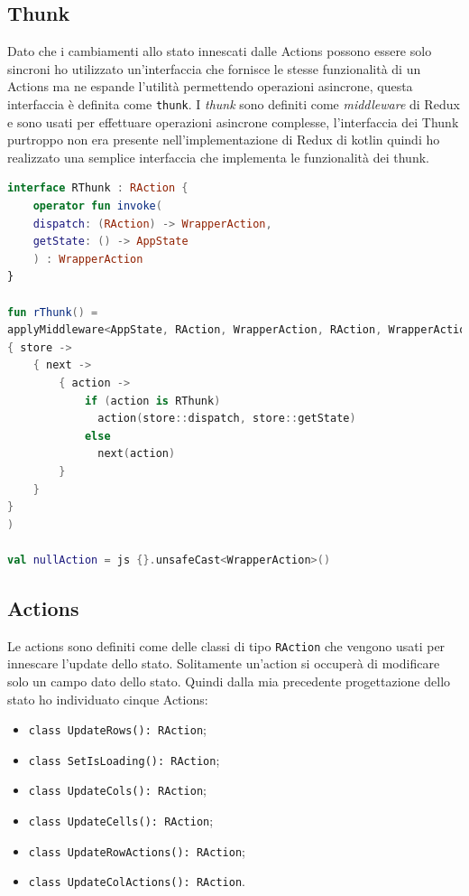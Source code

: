 \subsection{Thunk}
Dato che i cambiamenti allo stato innescati dalle Actions possono essere solo sincroni ho utilizzato un'interfaccia che fornisce le stesse funzionalità di un Actions ma ne espande l'utilità permettendo operazioni asincrone, questa interfaccia è definita come \verb|thunk|.
I \emph{thunk} sono definiti come \emph{middleware} di Redux e sono usati per effettuare operazioni asincrone complesse, l'interfaccia dei Thunk purtroppo non era presente nell'implementazione di Redux di kotlin quindi ho realizzato una semplice interfaccia che implementa le funzionalità dei thunk.
\begin{lstlisting}[caption={Interfaccia Thunk}, label={lst:bodycells}, language=Kotlin]
interface RThunk : RAction {
	operator fun invoke(
	dispatch: (RAction) -> WrapperAction,
	getState: () -> AppState
	) : WrapperAction
}

fun rThunk() =
applyMiddleware<AppState, RAction, WrapperAction, RAction, WrapperAction>(
{ store ->
	{ next ->
		{ action ->
			if (action is RThunk)
			  action(store::dispatch, store::getState)
			else
			  next(action)
		}
	}
}
)

val nullAction = js {}.unsafeCast<WrapperAction>()
\end{lstlisting}

\subsection{Actions}
Le actions sono definiti come delle classi di tipo \verb|RAction| che vengono usati per innescare l'update dello stato. Solitamente un'action si occuperà di modificare solo un campo dato dello stato. Quindi dalla mia precedente progettazione dello stato ho individuato cinque Actions:
\begin{itemize}
	\item \verb|class UpdateRows(): RAction|;
	\item \verb|class SetIsLoading(): RAction|;
	\item \verb|class UpdateCols(): RAction|;
	\item \verb|class UpdateCells(): RAction|;
	\item \verb|class UpdateRowActions(): RAction|;
	\item \verb|class UpdateColActions(): RAction|.
\end{itemize}

